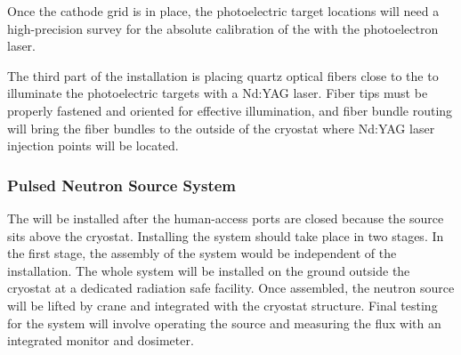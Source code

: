 Once the 
cathode grid is in place, the photoelectric target locations will need a high-precision survey %
for the absolute calibration of the \efield with the photoelectron laser. 

The third part of the installation is placing quartz optical fibers close to the  %
to illuminate the photoelectric targets with a Nd:YAG laser.  
Fiber tips must be properly fastened and oriented for effective illumination, and fiber bundle routing will bring the fiber bundles to the outside of the cryostat where Nd:YAG laser injection points will be located. 

\subsubsection{Pulsed Neutron Source System} 
The  will be installed after the human-access ports are closed because the source sits above the cryostat. Installing the system should take place in two stages. In the first stage, the assembly of the system would be independent of the  installation. The whole system will be installed on the ground outside the cryostat at a dedicated radiation safe facility. Once assembled, the neutron source will be lifted by crane and integrated with the cryostat structure. Final  testing for the system will involve operating the source and measuring the flux with an integrated monitor and dosimeter.


